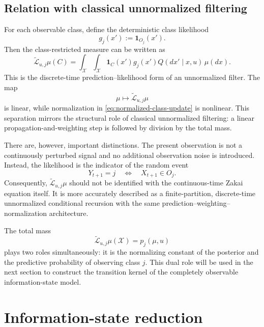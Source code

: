 \documentclass[10pt,twocolumn]{article}
\theoremstyle{remark}
\newcommand{\Xcal}{\mathcal{X}}
\newcommand{\one}{\mathbf{1}}
\begin{document}
\subsection{Relation with classical unnormalized filtering}
\label{subsec:relation-classical-filtering}

For each observable class, define the deterministic class likelihood
\begin{equation}
	g_j(x'):=\one_{O_j}(x').
	\label{eq:deterministic-class-likelihood}
\end{equation}
Then the class-restricted measure can be written as
\begin{equation*}
	\widetilde{\mathcal L}_{u,j}\mu(C)
	=
	\int_{\Xcal}\int_{\Xcal}
	\one_C(x')g_j(x')
	Q(dx'\mid x,u)\,\mu(dx).
	\label{eq:unnormalized-likelihood-form}
\end{equation*}
This is the discrete-time prediction--likelihood form of an unnormalized filter. The map
\[
\mu\longmapsto\widetilde{\mathcal L}_{u,j}\mu
\]
is linear, while normalization in \cref{eq:normalized-class-update} is nonlinear. This separation mirrors the structural role of classical unnormalized filtering: a linear propagation-and-weighting step is followed by division by the total mass.

There are, however, important distinctions. The present observation is not a continuously perturbed signal and no additional observation noise is introduced. Instead, the likelihood is the indicator of the random event
\[
Y_{t+1}=j
\quad\Longleftrightarrow\quad
X_{t+1}\in O_j.
\]
Consequently, \(\widetilde{\mathcal L}_{u,j}\mu\) should not be identified with the continuous-time Zakai equation itself. It is more accurately described as a finite-partition, discrete-time unnormalized conditional recursion with the same prediction--weighting--normalization architecture.

The total mass
\[
\widetilde{\mathcal L}_{u,j}\mu(\Xcal)=p_j(\mu,u)
\]
plays two roles simultaneously: it is the normalizing constant of the posterior and the predictive probability of observing class \(j\). This dual role will be used in the next section to construct the transition kernel of the completely observable information-state model.

%
%

\section{Information-state reduction}
\label{sec:information-state-reduction}
\end{document}
